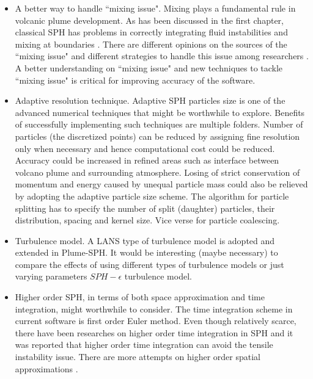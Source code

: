 \begin{itemize}
\item A better way to handle ``mixing issue". Mixing plays a fundamental rule in volcanic plume development. As has been discussed in the first chapter, classical SPH has problems in correctly integrating fluid instabilities and mixing at boundaries \citet{read2010resolving}. There are different opinions on the sources of the ``mixing issue" and different strategies to handle this issue among researchers \citep{chen1999improvement, ritchie2001multiphase, agertz2007fundamental, wadsley2008treatment, price2008modelling, read2010resolving, borgani2012hydrodynamic}. A better understanding on ``mixing issue" and new techniques to tackle ``mixing issue" is critical for improving accuracy of the software.
\item Adaptive resolution technique. Adaptive SPH particles size \citep{lopez2013dynamic, vacondio2016variable} is one of the advanced numerical techniques that might be worthwhile to explore. Benefits of successfully implementing such techniques are multiple folders. Number of particles (the discretized points) can be reduced by assigning fine resolution only when necessary and hence computational cost could be reduced. Accuracy could be increased in refined areas such as interface between volcano plume and surrounding atmosphere. Losing of strict conservation of momentum and energy caused by unequal particle mass could also be relieved by adopting the adaptive particle size scheme. The algorithm for particle splitting has to specify the number of split (daughter) particles, their distribution, spacing and kernel size. Vice verse for particle coalescing.
\item Turbulence model. A LANS type of turbulence model is adopted and extended in Plume-SPH. It would be interesting (maybe necessary) to compare the effects of using different types of turbulence models or just varying parameters $SPH-\epsilon$ turbulence model.
\item Higher order SPH, in terms of both space approximation and time integration, might worthwhile to consider. The time integration scheme in current software is first order Euler method. Even though relatively scarce, there have been researches \citep{blanc2012stabilized} on higher order time integration in SPH and it was reported that higher order time integration can avoid the tensile instability issue. There are more attempts on higher order spatial approximations \citep{bonet1999variational, dilts1999moving, leonardi2014explicit, lind2016high}.

\end{itemize}
